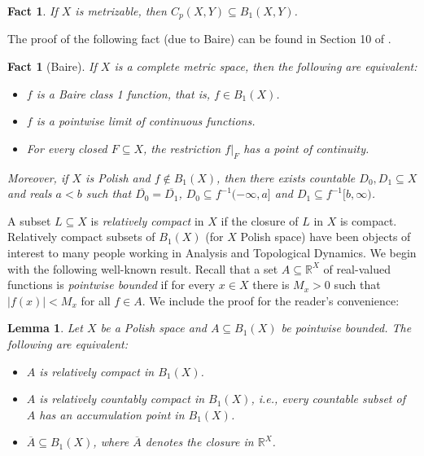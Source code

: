 \documentclass[psamsfonts]{amsart}
\newtheorem{lem}[thm]{Lemma}
\newtheorem{fact}[thm]{Fact}
\theoremstyle{definition}
\theoremstyle{remark}
\numberwithin{equation}{section}
\begin{document}
\begin{fact}
If $X$ is metrizable, then $C_p(X,Y)\subseteq B_1(X,Y)$.
\end{fact}

The proof of the following fact (due to Baire) can be found in Section 10 of \cite{Todorcevic_1997_TopicsTop}.

\begin{fact}[Baire]\label{baire}
    If $X$ is a complete metric space, then the following are equivalent:
    \begin{itemize}
        \item [(i)] $f$ is a Baire class 1 function, that is, $f\in B_1(X)$.
        \item [(ii)] $f$ is a pointwise limit of continuous functions.
        \item [(iii)] For every closed $F\subseteq X$, the restriction $f|_F$ has a point of continuity.
    \end{itemize}
    Moreover, if $X$ is Polish and $f\notin B_1(X)$, then there exists countable $D_0,D_1\subseteq X$ and reals $a<b$ such that $\overline{D_0}=\overline{D_1}$, $D_0\subseteq f^{-1}(-\infty,a]$ and $D_1\subseteq f^{-1}[b,\infty)$.
\end{fact}

A subset $L\subseteq X$ is \emph{relatively compact} in $X$ if the closure of $L$ in $X$ is compact. Relatively compact subsets of $B_1(X)$ (for $X$ Polish space) have been objects of interest to many people working in Analysis and Topological Dynamics. We begin with the following well-known result. Recall that a set $A\subseteq\mathbb{R}^X$ of real-valued functions is \emph{pointwise bounded} if for every $x\in X$ there is $M_x>0$ such that $|f(x)|<M_x$ for all $f\in A$. We include the proof for the reader's convenience:

\begin{lem}
    Let $X$ be a Polish space and $A\subseteq B_1(X)$ be pointwise bounded. The following are equivalent:
    \begin{itemize}
        \item [(i)] $A$ is relatively compact in $B_1(X)$.
        \item [(ii)] $A$ is relatively countably compact in $B_1(X)$, i.e., every countable subset of $A$ has an accumulation point in $B_1(X)$.
        \item [(iii)] $\overline{A}\subseteq B_1(X)$, where $\overline{A}$ denotes the closure in $\mathbb{R}^X$.
    \end{itemize}
\end{lem}
\end{document}
